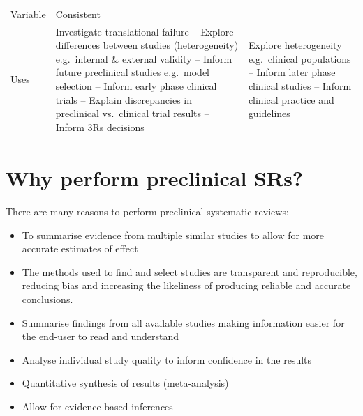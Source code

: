 \documentclass[
]{book}
\providecommand{\tightlist}{%
  \setlength{\itemsep}{0pt}\setlength{\parskip}{0pt}}
\begin{document}
\begin{longtable}[]{@{}lll@{}}
\begin{minipage}[t]{0.24\columnwidth}
Variable\strut
\end{minipage} & \begin{minipage}[t]{0.22\columnwidth}\raggedright
Consistent\strut
\end{minipage}\tabularnewline
\begin{minipage}[t]{0.46\columnwidth}\raggedright
Uses\strut
\end{minipage} & \begin{minipage}[t]{0.24\columnwidth}\raggedright
Investigate translational failure -- Explore differences between studies (heterogeneity) e.g.~internal \& external validity -- Inform future preclinical studies e.g.~model selection -- Inform early phase clinical trials -- Explain discrepancies in preclinical vs.~clinical trial results -- Inform 3Rs decisions\strut
\end{minipage} & \begin{minipage}[t]{0.22\columnwidth}\raggedright
Explore heterogeneity e.g.~clinical populations -- Inform later phase clinical studies -- Inform clinical practice and guidelines\strut
\end{minipage}\tabularnewline
\bottomrule
\end{longtable}

\hypertarget{why-perform-preclinical-srs}{%
\section{Why perform preclinical SRs?}\label{why-perform-preclinical-srs}}

There are many reasons to perform preclinical systematic reviews:

\begin{itemize}
\tightlist
\item
  To summarise evidence from multiple similar studies to allow for more accurate estimates of effect
\item
  The methods used to find and select studies are transparent and reproducible, reducing bias and increasing the likeliness of producing reliable and accurate conclusions.
\item
  Summarise findings from all available studies making information easier for the end-user to read and understand
\item
  Analyse individual study quality to inform confidence in the results
\item
  Quantitative synthesis of results (meta-analysis)
\item
  Allow for evidence-based inferences
\end{itemize}
\end{document}
